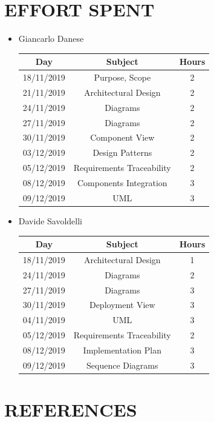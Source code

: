 \documentclass[12pt,a4paper]{article}
\begin{document}
\section{EFFORT SPENT}
\begin{itemize}
		\item Giancarlo Danese
		\begin{center}
			\begin{tabular}{| c | c | c |}
				\hline
				Day & Subject & Hours \\ \hline
				18/11/2019 & Purpose, Scope & 2 \\
				21/11/2019 & Architectural Design & 2\\
				24/11/2019 & Diagrams & 2\\
				27/11/2019 & Diagrams & 2\\
				30/11/2019 & Component View & 2\\
				03/12/2019 & Design Patterns & 2\\
				05/12/2019 & Requirements Traceability & 2\\
				08/12/2019 & Components Integration & 3\\
				09/12/2019 & UML & 3\\
				\hline
			\end{tabular}
		\end{center}

		\item Davide Savoldelli
		\begin{center}
			\begin{tabular}{| c | c | c |}
				\hline
				Day & Subject & Hours \\ \hline
				18/11/2019 & Architectural Design & 1 \\
				24/11/2019 & Diagrams & 2 \\
				27/11/2019 & Diagrams & 3 \\
				30/11/2019 & Deployment View & 3\\
				04/11/2019 & UML & 3 \\
				05/12/2019 & Requirements Traceability & 2\\
				08/12/2019 & Implementation Plan & 3\\
				09/12/2019 & Sequence Diagrams & 3\\
				\hline
			\end{tabular}
		\end{center}
	\end{itemize}
\newpage
\section{REFERENCES}
\end{document}
